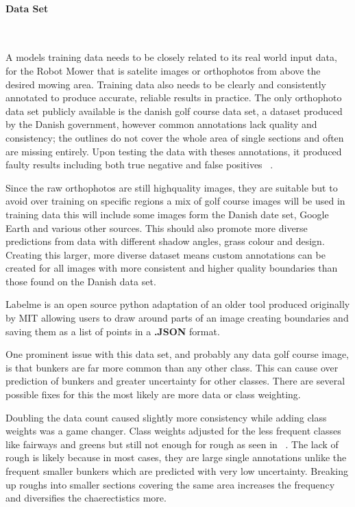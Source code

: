 \documentclass[final]{cmpreport_02}
\begin{document}
\paragraph{Data Set} \

A models training data needs to be closely related to its real world input data, for the Robot Mower that is satelite images or orthophotos from above the desired mowing area.
Training data also needs to be clearly and consistently annotated to produce accurate, reliable results in practice.
The only orthophoto data set publicly available is the danish golf course data set, a dataset produced by the Danish government, however common annotations lack quality and consistency; the outlines do not cover the whole area of single sections and often are missing entirely.
Upon testing the data with theses annotations, it produced faulty results including both true negative and false positives ~.

Since the raw orthophotos are still highquality images, they are suitable but to avoid over training on specific regions a mix of golf course images will be used in training data this will include some images form the Danish date set, Google Earth and various other sources.
This should also promote more diverse predictions from data with different shadow angles, grass colour and design.
Creating this larger, more diverse dataset means custom annotations can be created for all images with more consistent and higher quality boundaries than those found on the Danish data set.

Labelme \citep{labelme} is an open source python adaptation of an older tool produced originally by MIT allowing users to draw around parts of an image creating boundaries and saving them as a list of points in a \textbf{.JSON} format.


One prominent issue with this data set, and probably any data golf course image, is that bunkers are far more common than any other class.
This can cause over prediction of bunkers and greater uncertainty for other classes.
There are several possible fixes for this the most likely are more data or class weighting.

Doubling the data count caused slightly more consistency while adding class weights was a game changer.
Class weights adjusted for the less frequent classes like fairways and greens but still not enough for rough as seen in ~.
The lack of rough is likely because in most cases, they are large single annotations unlike the frequent smaller bunkers which are predicted with very low uncertainty.
Breaking up roughs into smaller sections covering the same area increases the frequency and diversifies the chaerectistics more.
\end{document}
